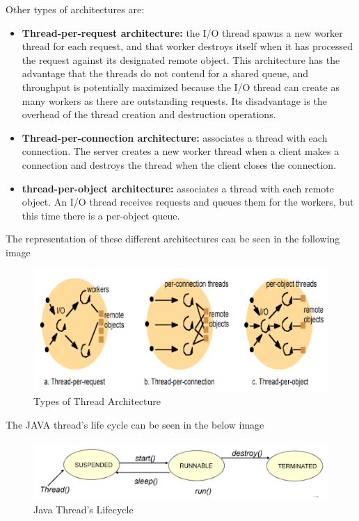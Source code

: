 Other types of architectures are:
\begin{itemize}
    \item \textbf{Thread-per-request architecture:} the I/O thread spawns a new worker thread for each request, and that worker destroys itself when it has processed the request against its designated remote object. This architecture has the advantage that the threads do not contend for a shared queue, and throughput is potentially maximized because the I/O thread can create as many workers as there are outstanding requests. Its disadvantage is the overhead of the thread creation and destruction operations.
    \item \textbf{Thread-per-connection architecture:} associates a thread with each connection. The server creates a new worker thread when a client makes a connection and destroys the thread when the client closes the connection.
    \item \textbf{thread-per-object architecture:} associates a thread with each remote object. An I/O thread receives requests and queues them for the workers, but this time there is a per-object queue.
\end{itemize}
The representation of these different architectures can be seen in the following image

\begin{figure}[!h]
    \centering
    \includegraphics[width=.7\linewidth]{images/OperatingSystemSupport/typeofthread.png}
    \caption{Types of Thread Architecture}
\end{figure}
\newpage
The JAVA thread’s life cycle can be seen in the below image

\begin{figure}[!h]
    \centering
    \includegraphics[width=.7\linewidth]{images/OperatingSystemSupport/javalifeciclethread.png}
    \caption{Java Thread's Lifecycle}
\end{figure}


